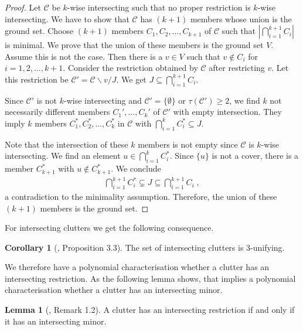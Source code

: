 \documentclass[a4paper, 12pt, twoside=false]{scrbook}
\theoremstyle{definition}
\newtheorem{corollary}[theorem]{Corollary}
\newtheorem{lemma}[theorem]{Lemma}
\begin{document}
   \begin{proof}
       Let $\mathcal{C}$ be $k$-wise intersecting such that no proper restriction is $k$-wise intersecting.
       We have to show that $\mathcal{C}$ has $(k+1)$ members whose union is the ground set.
       Choose $(k+1)$ members $C_1, C_2, \ldots, C_{k+1}$ of $\mathcal{C}$ such that $|\bigcap_{i=1}^{k+1} C_i|$ is minimal.
       We prove that the union of these members is the ground set $V$.
       Assume this is not the case.
       Then there is a $v \in V$ such that $v \not\in C_i$ for $i=1,2, \ldots, k+1$.
       Consider the restriction obtained by $\mathcal{C}$ after restricting $v$.
       Let this restriction be $\mathcal{C'}=\mathcal{C} \backslash v / J$.
       We get $J \subseteq \bigcap_{i=1}^{k+1} C_i$.

       Since $\mathcal{C'}$ is not $k$-wise intersecting and $\mathcal{C'}=\{\emptyset\}$ or $\tau(\mathcal{C'})\geq 2$, we find $k$ not necessarily different members $C_1',\ldots, C_k'$ of $\mathcal{C'}$ with empty intersection.
       They imply $k$ members $C_1^*, C_2^*,\ldots, C_k^*$ in $\mathcal{C}$ with $\bigcap_{i=1}^k C_i^* \subseteq J$.

       Note that the intersection of these $k$ members is not empty since $\mathcal{C}$ is $k$-wise intersecting.
       We find an element $u \in \bigcap_{i=1}^k C_i^*$. Since $\{u\}$ is not a cover, there is a member $C_{k+1}^*$ with $u \not\in C_{k+1}^*$.
       We conclude
       \begin{align*}
           \bigcap_{i=1}^{k+1} C_i^* \subsetneq J \subseteq \bigcap_{i=1}^{k+1} C_i \;,
       \end{align*}
       a contradiction to the minimality assumption.
       Therefore, the union of these $(k+1)$ members is the ground set.


   \end{proof}

   For intersecting clutters we get the following consequence.
   \begin{corollary}[\cite{restrictions}, Proposition 3.3]
       The set of intersecting clutters is 3-unifying.
   \end{corollary}
   We therefore have a polynomial characterisation whether a clutter has an intersecting restriction. As the following lemma shows, that implies a polynomial characterisation whether a clutter has an intersecting minor.

   \begin{lemma}[\cite{restrictions}, Remark 1.2]\label{intersectingminor}
       A clutter has an intersecting restriction if and only if it has an intersecting minor.
   \end{lemma}
\end{document}

